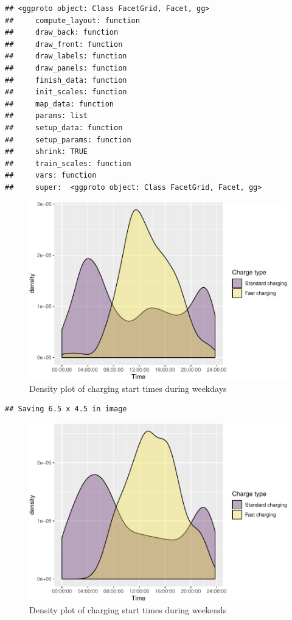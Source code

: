 \documentclass[]{article}
\begin{document}
\begin{verbatim}
## <ggproto object: Class FacetGrid, Facet, gg>
##     compute_layout: function
##     draw_back: function
##     draw_front: function
##     draw_labels: function
##     draw_panels: function
##     finish_data: function
##     init_scales: function
##     map_data: function
##     params: list
##     setup_data: function
##     setup_params: function
##     shrink: TRUE
##     train_scales: function
##     vars: function
##     super:  <ggproto object: Class FacetGrid, Facet, gg>
\end{verbatim}

\begin{figure}
\centering
\includegraphics{EVBB_report_files/figure-latex/chargeBeginsWeekday-1.pdf}
\caption{\label{fig:chargeBeginsWeekday}Density plot of charging start times
during weekdays}
\end{figure}

\begin{verbatim}
## Saving 6.5 x 4.5 in image
\end{verbatim}

\begin{figure}
\centering
\includegraphics{EVBB_report_files/figure-latex/chargeBeginsWeekend-1.pdf}
\caption{\label{fig:chargeBeginsWeekend}Density plot of charging start times
during weekends}
\end{figure}
\end{document}
